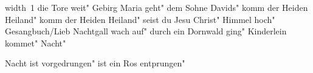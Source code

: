 \ifx\mxversion\undefined
  
  
  
  
\fi

%
\hbox{\pdfximage width 1\pdfrefximage\pdflastximage}\vfill\eject
\tableofcontents
\normalmusicsize
 die Tore weit"
 Gebirg Maria geht"
 dem Sohne Davids"
 komm der Heiden Heiland"
 komm der Heiden Heiland"
 seist du Jesu Christ"
 Himmel hoch"
 Gesangbuch/Lieb Nachtgall wach auf"
 durch ein Dornwald ging"
 Kinderlein kommet"
 Nacht"

\makeatletter
{}
\makeatother
 Nacht ist vorgedrungen"
 ist ein Ros entprungen"
\bookbye